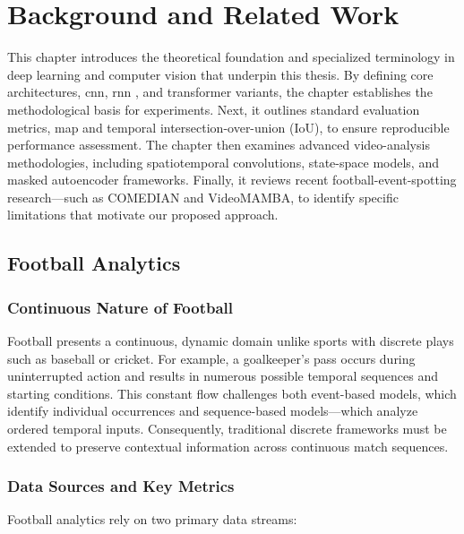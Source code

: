 \chapter{Background and Related Work}
\label{chap:background}

This chapter introduces the theoretical foundation and specialized terminology in deep learning and computer vision that underpin this thesis. By defining core architectures, \acrlong{cnn}, \acrlong{rnn} , and transformer variants, the chapter establishes the methodological basis for experiments. Next, it outlines standard evaluation metrics, \acrfull{map} and temporal intersection-over-union (IoU), to ensure reproducible performance assessment. The chapter then examines advanced video-analysis methodologies, including spatiotemporal convolutions, state-space models, and masked autoencoder frameworks. Finally, it reviews recent football-event-spotting research—such as COMEDIAN and VideoMAMBA, to identify specific limitations that motivate our proposed approach.

\section{Football Analytics}
\label{sec:football_analytics}

\subsection{Continuous Nature of Football}
Football presents a continuous, dynamic domain unlike sports with discrete plays such as baseball or cricket. For example, a goalkeeper's pass occurs during uninterrupted action and results in numerous possible temporal sequences and starting conditions. This constant flow challenges both event-based models, which identify individual occurrences and sequence-based models—which analyze ordered temporal inputs. Consequently, traditional discrete frameworks must be extended to preserve contextual information across continuous match sequences. 

\subsection{Data Sources and Key Metrics}
Football analytics rely on two primary data streams:

